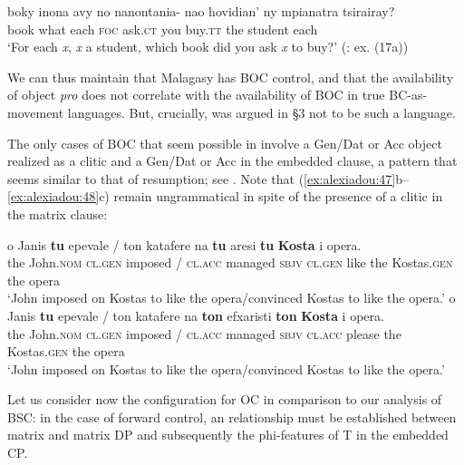 \documentclass[output=paper]{langsci/langscibook}
\begin{document}
\ea%
    \label{ex:alexiadou:49}
    \gll boky inona avy no nanontania- nao hovidian’ ny mpianatra tsirairay?\\
         book what each \textsc{foc}  ask.\textsc{ct}  you buy.\textsc{tt} the student each\\
    \glt ‘For each \textit{x}, \textit{x} a student, which book did you ask \textit{x} to buy?’ (\citealt{Potsdam2006Backward}: ex. (17a))
    \z

We can thus maintain that Malagasy has BOC control, and that the availability of object \textit{pro} does not correlate with the availability of BOC in true BC-as-movement languages. But, crucially,  was argued in §3 not to be such a language.

The only cases of BOC that seem possible in  involve a Gen\slash Dat or Acc object realized as a clitic and a Gen\slash Dat or Acc  in the embedded clause, a pattern that seems similar to that of resumption; see . Note that (\ref{ex:alexiadou:47}b--\ref{ex:alexiadou:48}c) remain ungrammatical in spite of the presence of a clitic in the matrix clause:\largerpage

\ea%
    \label{ex:alexiadou:50}
    \ea
    \gll o    Janis    \textbf{tu}  epevale / ton katafere   na   \textbf{tu} aresi  \textbf{tu}  \textbf{Kosta}          i opera.\\
                   the John.\textsc{nom}   \textsc{cl.gen}  imposed / \textsc{cl.acc} managed  \textsc{sbjv} \textsc{cl.gen}  like   the Kostas.\textsc{gen} the opera\\
    \glt           ‘John imposed on Kostas to like the opera\slash convinced Kostas to like the opera.’
    \ex
    \gll o    Janis    \textbf{tu}  epevale / ton katafere   na   \textbf{ton} efxaristi  \textbf{ton}  \textbf{Kosta}         i opera.\\
           the John.\textsc{nom} \textsc{cl.gen}  imposed / \textsc{cl.acc} managed  \textsc{sbjv} \textsc{cl.acc}  please the Kostas.\textsc{gen} the opera\\
    \glt   ‘John imposed on Kostas to like the opera\slash convinced Kostas to like the opera.’
    \z
\z

Let us consider now the configuration for OC in comparison to our analysis of BSC: in the case of forward control, an  relationship must be established between matrix  and matrix DP and subsequently the phi-features of T in the embedded CP.    
\end{document}
